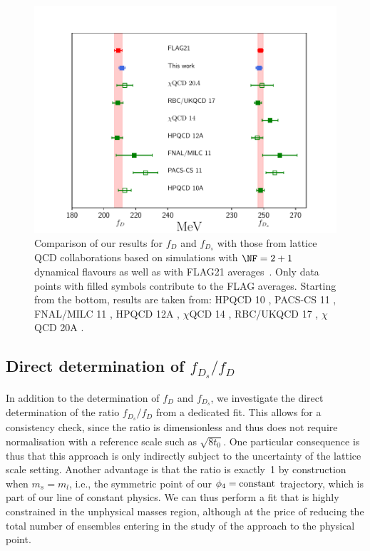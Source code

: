\begin{figure}[t!]
	\centering
	\includegraphics[scale=0.70]{./cap6/figs/fds/fds_comparison.pdf}
	\caption{Comparison of our results for $f_D$ and $f_{D_s}$  with those from lattice QCD collaborations based on simulations with $\NF=2+1$ dynamical flavours as well as with FLAG21 averages~\cite{FlavourLatticeAveragingGroupFLAG:2021npn}.
          Only data points with filled symbols contribute to  the FLAG averages. Starting from the bottom, results are taken from: HPQCD 10 \cite{Davies:2010ip}, PACS-CS 11 \cite{PACS-CS:2011ngu}, FNAL/MILC 11 \cite{FermilabLattice:2011njy}, HPQCD 12A \cite{Na:2012iu}, $\chi$QCD 14 \cite{Yang:2014sea}, RBC/UKQCD 17 \cite{Boyle:2017jwu},  $\chi$QCD 20A \cite{Chen:2020qma}.
          }
	\label{fig:fds_comparison}
\end{figure}


\subsection{Direct determination of $f_{D_s}/f_D$}

In addition to the determination of $f_D$ and $f_{D_s}$, we investigate the direct determination
of the ratio $f_{D_s}/f_D$ from a dedicated fit. This allows for a consistency check, since
the ratio is dimensionless and thus does not require normalisation with a reference scale
such as $\sqrt{8t_0}$. One particular consequence is thus that this approach is only
indirectly subject to the uncertainty of the lattice scale setting. Another advantage
is that the ratio is exactly~1 by construction when $m_s=m_l$, i.e., the symmetric
point of our $\phi_4={\rm constant}$ trajectory, which is part of our line of constant
physics. We can thus perform a fit that is highly constrained in the unphysical masses
region, although at the price of reducing the total number of ensembles entering in the study of the approach to the physical point.

